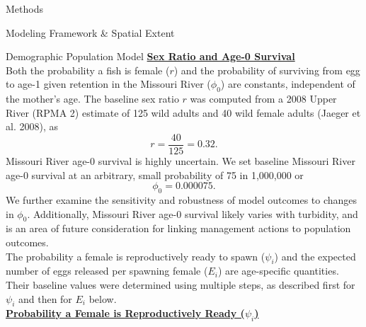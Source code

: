 \documentclass[12pt]{article}
\begin{document}
\begin{section}{Methods}
\begin{subsection}{Modeling Framework \& Spatial Extent}
\begin{subsubsection}{Demographic Population Model}
\textbf{\underline{Sex Ratio and Age-0 Survival}}\\

\vspace{-6pt}Both the probability a fish is female ($r$) and the probability of surviving from egg to age-1 given retention in the Missouri River ($\phi_0$) are constants, independent of the mother's age.  The baseline sex ratio $r$ was computed from a 2008 Upper River (RPMA 2) estimate of 125 wild adults and 40 wild female adults (Jaeger et al. 2008), as
\begin{equation}
r=\frac{40}{125}= 0.32.
\end{equation} 
Missouri River age-0 survival is highly uncertain.  We set baseline Missouri River age-0 survival at an arbitrary, small probability of 75 in 1,000,000 or
\begin{equation}
\phi_0=0.000075.
\end{equation}
We further examine the sensitivity and robustness of model outcomes to changes in $\phi_0$.   Additionally, Missouri River age-0 survival likely varies with turbidity, and is an area of future consideration for linking management actions to population outcomes.\\

The probability a female is reproductively ready to spawn ($\psi_i$) and the expected number of eggs released per spawning female ($E_i$) are age-specific quantities.  Their baseline values were determined using multiple steps, as described first for $\psi_i$ and then for $E_i$ below.\\ 

\textbf{\underline{Probability a Female is Reproductively Ready ($\psi_i$)}}\\


\end{subsubsection}
\end{subsection}
\end{section}
\end{document}

